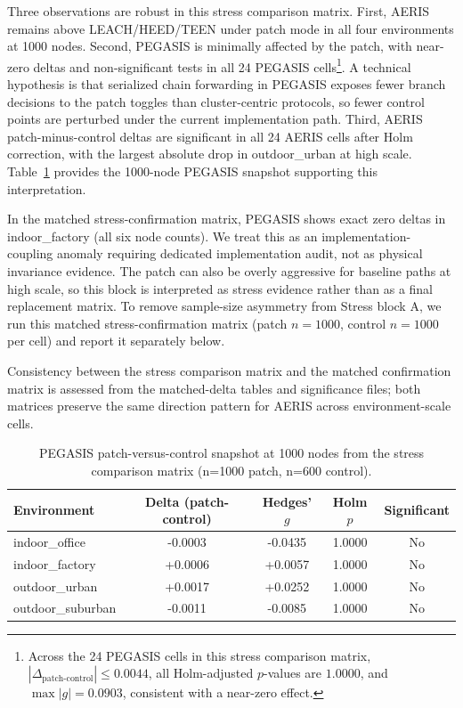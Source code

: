 ﻿\documentclass[sensors,article,submit,moreauthors,pdftex]{Definitions/mdpi}
\begin{document}
Three observations are robust in this stress comparison matrix. First, AERIS remains above LEACH/HEED/TEEN under patch mode in all four environments at 1000 nodes. Second, PEGASIS is minimally affected by the patch, with near-zero deltas and non-significant tests in all 24 PEGASIS cells\footnote{Across the 24 PEGASIS cells in this stress comparison matrix, \(|\Delta_{\text{patch-control}}| \le 0.0044\), all Holm-adjusted \(p\)-values are \(1.0000\), and \(\max |g| = 0.0903\), consistent with a near-zero effect.}. A technical hypothesis is that serialized chain forwarding in PEGASIS exposes fewer branch decisions to the patch toggles than cluster-centric protocols, so fewer control points are perturbed under the current implementation path. Third, AERIS patch-minus-control deltas are significant in all 24 AERIS cells after Holm correction, with the largest absolute drop in outdoor\_urban at high scale. Table~\ref{tab:s9_pegasis_1000} provides the 1000-node PEGASIS snapshot supporting this interpretation.

In the matched stress-confirmation matrix, PEGASIS shows exact zero deltas in indoor\_factory (all six node counts). We treat this as an implementation-coupling anomaly requiring dedicated implementation audit, not as physical invariance evidence. The patch can also be overly aggressive for baseline paths at high scale, so this block is interpreted as stress evidence rather than as a final replacement matrix. To remove sample-size asymmetry from Stress block A, we run this matched stress-confirmation matrix (patch \(n=1000\), control \(n=1000\) per cell) and report it separately below.

Consistency between the stress comparison matrix and the matched confirmation matrix is assessed from the matched-delta tables and significance files; both matrices preserve the same direction pattern for AERIS across environment-scale cells.

\begin{table}[H]
\caption{PEGASIS patch-versus-control snapshot at 1000 nodes from the stress comparison matrix (n=1000 patch, n=600 control).}
\label{tab:s9_pegasis_1000}
\centering
\begin{tabular}{lcccc}
\toprule
Environment & Delta (patch-control) & Hedges' $g$ & Holm $p$ & Significant \\
\midrule
indoor\_office    & -0.0003 & -0.0435 & 1.0000 & No \\
indoor\_factory   & +0.0006 & +0.0057 & 1.0000 & No \\
outdoor\_urban    & +0.0017 & +0.0252 & 1.0000 & No \\
outdoor\_suburban & -0.0011 & -0.0085 & 1.0000 & No \\
\bottomrule
\end{tabular}
\end{table}
\end{document}
